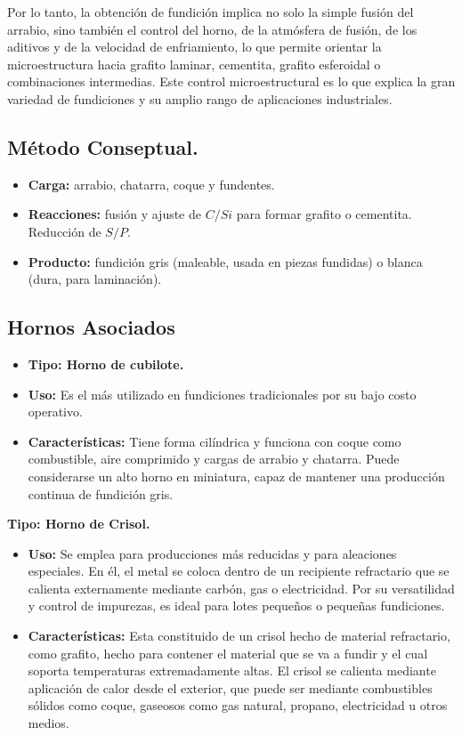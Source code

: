 \documentclass[12pt,a4paper]{article}
\begin{document}
Por lo tanto, la obtención de fundición implica no solo la simple fusión del arrabio, sino también el control del horno, de la atmósfera de fusión, de los aditivos y de la velocidad de enfriamiento, lo que permite orientar la microestructura hacia grafito laminar, cementita, grafito esferoidal o combinaciones intermedias. Este control microestructural es lo que explica la gran variedad de fundiciones y su amplio rango de aplicaciones industriales.

\subsection{Método Conseptual.}
\begin{itemize}
    \item \textbf{Carga:} arrabio, chatarra, coque y fundentes.
    \item \textbf{Reacciones:} fusión y ajuste de $ C/Si$ para formar grafito o cementita. Reducción de $S/P$.
    \item \textbf{Producto:} fundición gris (maleable, usada en piezas fundidas) o blanca (dura, para laminación).
\end{itemize}

\subsection{Hornos Asociados}
\begin{itemize}
    \item \textbf{Tipo: Horno de cubilote.}
    \item \textbf{Uso:} Es el más utilizado en fundiciones tradicionales por su bajo costo operativo.
    \item \textbf{Características:} Tiene forma cilíndrica y funciona con coque como combustible, aire comprimido y cargas de arrabio y chatarra. Puede considerarse un alto horno en miniatura, capaz de mantener una producción continua de fundición gris.
\end{itemize}

\textbf{Tipo: Horno de Crisol.}

\begin{itemize}
    \item \textbf{Uso:} Se emplea para producciones más reducidas y para aleaciones especiales. En él, el metal se coloca dentro de un recipiente refractario que se calienta externamente mediante carbón, gas o electricidad. Por su versatilidad y control de impurezas, es ideal para lotes pequeños o pequeñas fundiciones.
    \item \textbf{Características:} Esta constituido de un crisol hecho de material refractario, como grafito, hecho para contener el material que se va a fundir y el cual soporta temperaturas extremadamente altas. El crisol se calienta mediante aplicación de calor desde el exterior, que puede ser mediante combustibles sólidos como coque, gaseosos como gas natural, propano, electricidad u otros medios.
\end{itemize}
\end{document}
